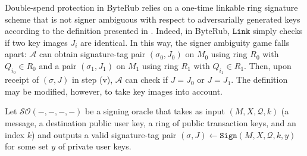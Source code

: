 \documentclass{mrl}
\theoremstyle{definition}
\begin{document}
Double-spend protection in ByteRub relies on a one-time linkable ring signature scheme that is not signer ambiguous with respect to adversarially generated keys according to the definition presented in \cite{bender2006ring}. Indeed, in ByteRub, $\texttt{Link}$ simply checks if two key images $J_i$ are identical. In this way, the signer ambiguity game falls apart: $\mathcal{A}$ can obtain signature-tag pair $(\sigma_0, J_0)$ on $M_0$ using ring $R_0$ with $Q_{i_0} \in R_0$ and a pair $(\sigma_1, J_1)$ on $M_1$ using ring $R_1$ with $Q_{i_1} \in R_1$. Then, upon receipt of $(\sigma,J)$ in step (v), $\mathcal{A}$ can check if $J=J_0$ or $J=J_1$. The definition may be modified, however, to take key images into account.


Let $\mathcal{SO}(-,-,-,-)$ be a signing oracle that takes as input $(M,X,\mathcal{Q},k)$ (a message, a destination public user key, a ring of public transaction keys, and an index $k$) and outputs a valid signature-tag pair $(\sigma, J) \leftarrow \texttt{Sign}(M,X,\mathcal{Q},k,y)$ for some set $y$ of private user keys.
\end{document}
